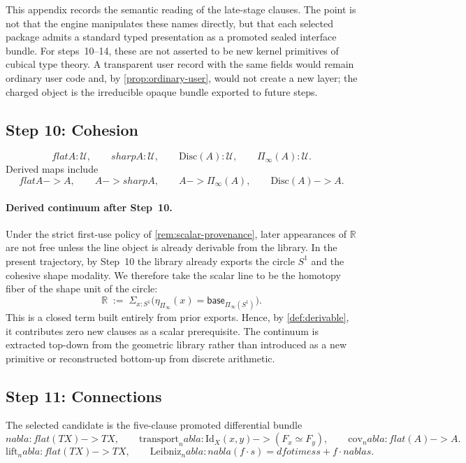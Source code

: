 \documentclass[11pt,a4paper]{article}
\def\to{->}%
\def\otimes{otimes}%
\def\nabla{nabla}%
\def\flat{flat}%
\def\sharp{sharp}%
\theoremstyle{plain}
\theoremstyle{definition}
\theoremstyle{remark}
\newcommand{\R}{\mathbb{R}}
\newcommand{\U}{\mathcal{U}}
\newcommand{\Shape}{\Pi_{\!\infty}}
\newcommand{\Disc}{\mathrm{Disc}}
\begin{document}
This appendix records the semantic reading of the late-stage clauses.  The point is not that the engine manipulates these names directly, but that each selected package admits a standard typed presentation as a promoted sealed interface bundle.  For steps~10--14, these are not asserted to be new kernel primitives of cubical type theory.  A transparent user record with the same fields would remain ordinary user code and, by \cref{prop:ordinary-user}, would not create a new layer; the charged object is the irreducible opaque bundle exported to future steps.

\subsection{Step 10: Cohesion}

\[
  \flat A:\U,\qquad
  \sharp A:\U,\qquad
  \Disc(A):\U,\qquad
  \Shape(A):\U.
\]
Derived maps include
\[
  \flat A\to A,
  \qquad
  A\to \sharp A,
  \qquad
  A\to \Shape(A),
  \qquad
  \Disc(A)\to A.
\]

\paragraph{Derived continuum after Step~10.}
Under the strict first-use policy of \cref{rem:scalar-provenance}, later appearances of $\R$ are not free unless the line object is already derivable from the library.  In the present trajectory, by Step~10 the library already exports the circle $S^1$ and the cohesive shape modality.  We therefore take the scalar line to be the homotopy fiber of the shape unit of the circle:
\[
  \R \;:=\; \Sigma_{x:S^1}\bigl(\eta_{\Shape}(x)=\mathsf{base}_{\Shape(S^1)}\bigr).
\]
This is a closed term built entirely from prior exports.  Hence, by \cref{def:derivable}, it contributes zero new clauses as a scalar prerequisite.  The continuum is extracted top-down from the geometric library rather than introduced as a new primitive or reconstructed bottom-up from discrete arithmetic.

\subsection{Step 11: Connections}

The selected candidate is the five-clause promoted differential bundle
\[
  \nabla:\flat(TX)\to TX,
  \qquad
  \mathrm{transport}_\nabla:\mathrm{Id}_X(x,y)\to (F_x\simeq F_y),
  \qquad
  \mathrm{cov}_\nabla:\flat(A)\to A.
\]
\[
  \mathrm{lift}_\nabla:\flat(TX)\to TX,
  \qquad
  \mathrm{Leibniz}_\nabla:\nabla(f\cdot s)=df\otimes s + f\cdot \nabla s.
\]
\end{document}
